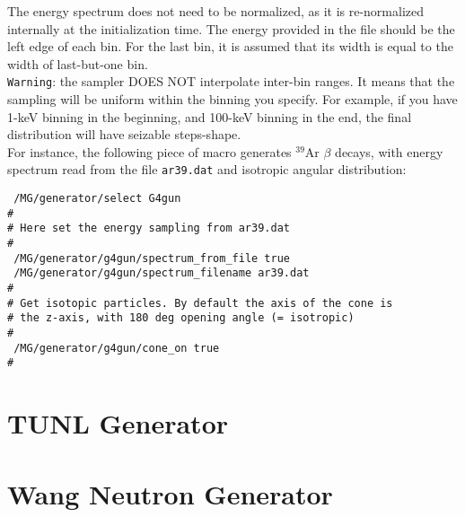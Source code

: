 The energy spectrum does not need to be normalized, as it is re-normalized internally at the initialization 
time. The energy provided in the file should be the left edge of each bin. For the last bin, it is assumed 
that its width is equal to the width of last-but-one bin. \\

\nolinkurl{Warning}: the sampler DOES NOT interpolate inter-bin ranges. It means that the sampling will be uniform
within the binning you specify. For example, if you have 1-keV binning in the beginning, and 100-keV binning in the end,
the final distribution will have seizable steps-shape. \\

For instance, the following piece of macro generates $^{39}$Ar $\beta$ decays, with energy spectrum read 
from the file \texttt{ar39.dat} and isotropic angular distribution:
\begin{lstlisting}
 /MG/generator/select G4gun
#
# Here set the energy sampling from ar39.dat
#
 /MG/generator/g4gun/spectrum_from_file true
 /MG/generator/g4gun/spectrum_filename ar39.dat
#
# Get isotopic particles. By default the axis of the cone is
# the z-axis, with 180 deg opening angle (= isotropic)
#
 /MG/generator/g4gun/cone_on true
#
\end{lstlisting}

\section{TUNL Generator}

\section{Wang Neutron Generator}

